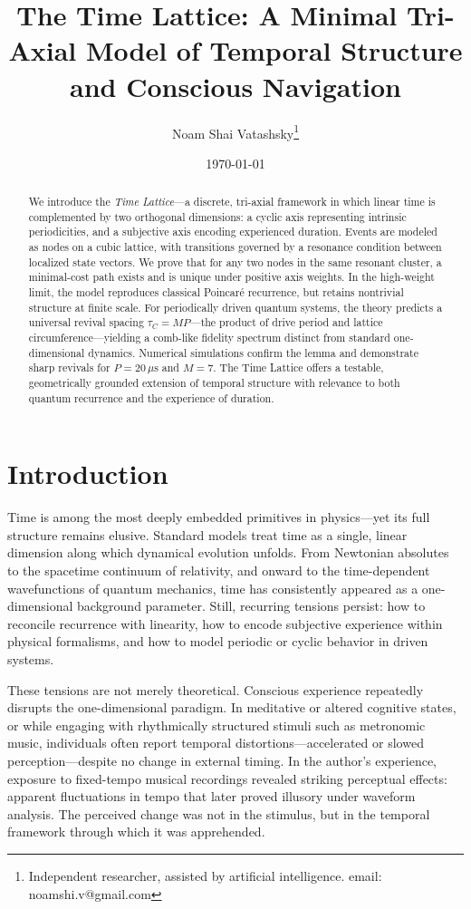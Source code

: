 \documentclass[11pt]{article}
\title{The Time Lattice: A Minimal Tri-Axial Model of Temporal Structure and Conscious Navigation}
\author{Noam Shai Vatashsky\thanks{Independent researcher, assisted by artificial intelligence. email: noamshi.v@gmail.com}}
\date{\today}
\begin{document}
\maketitle

\begin{abstract}
We introduce the \textit{Time Lattice}—a discrete, tri-axial framework in which linear time is complemented by two orthogonal dimensions: a cyclic axis representing intrinsic periodicities, and a subjective axis encoding experienced duration. Events are modeled as nodes on a cubic lattice, with transitions governed by a resonance condition between localized state vectors. We prove that for any two nodes in the same resonant cluster, a minimal-cost path exists and is unique under positive axis weights. In the high-weight limit, the model reproduces classical Poincaré recurrence, but retains nontrivial structure at finite scale. For periodically driven quantum systems, the theory predicts a universal revival spacing $\tau_C = MP$—the product of drive period and lattice circumference—yielding a comb-like fidelity spectrum distinct from standard one-dimensional dynamics. Numerical simulations confirm the lemma and demonstrate sharp revivals for $P = 20\,\mu\text{s}$ and $M = 7$. The Time Lattice offers a testable, geometrically grounded extension of temporal structure with relevance to both quantum recurrence and the experience of duration.
\end{abstract}

\section{Introduction}

Time is among the most deeply embedded primitives in physics—yet its full structure remains elusive. Standard models treat time as a single, linear dimension along which dynamical evolution unfolds. From Newtonian absolutes to the spacetime continuum of relativity, and onward to the time-dependent wavefunctions of quantum mechanics, time has consistently appeared as a one-dimensional background parameter. Still, recurring tensions persist: how to reconcile recurrence with linearity, how to encode subjective experience within physical formalisms, and how to model periodic or cyclic behavior in driven systems.

These tensions are not merely theoretical. Conscious experience repeatedly disrupts the one-dimensional paradigm. In meditative or altered cognitive states, or while engaging with rhythmically structured stimuli such as metronomic music, individuals often report temporal distortions—accelerated or slowed perception—despite no change in external timing. In the author’s experience, exposure to fixed-tempo musical recordings revealed striking perceptual effects: apparent fluctuations in tempo that later proved illusory under waveform analysis. The perceived change was not in the stimulus, but in the temporal framework through which it was apprehended.
\end{document}
